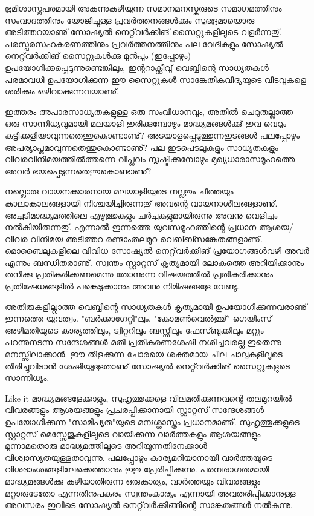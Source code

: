ഭൂമിശാസ്ത്രപരമായി അകന്നുകഴിയുന്ന സമാനമനസ്കരുടെ സമാഗമത്തിനും സംവാദത്തിനും യോജിച്ചുള്ള പ്രവര്‍ത്തനങ്ങള്‍ക്കും 
സുഭദ്രമായൊരു അടിത്തറയാണു് സോഷ്യല്‍ നെറ്റ്‌വര്‍ക്കിങ് സൈറ്റുകളിലൂടെ വളര്‍ന്നതു്. പരസ്പരസഹകരണത്തിനും 
പ്രവര്‍ത്തനത്തിനും പല വേദികളും സോഷ്യല്‍ നെറ്റ്‌വര്‍ക്കിങ് സൈറ്റുകള്‍ക്കു മുന്‍പും (ഇപ്പോഴും) ഉപയോഗിക്കപ്പെടുന്നുണ്ടെങ്കിലും, 
ഇന്ററാക്റ്റീവു് വെബ്ബിന്റെ സാധ്യതകള്‍ പരമാവധി ഉപയോഗിക്കുന്ന ഈ സൈറ്റുകള്‍ സാങ്കേതികവിദ്യയുടെ വിടവുകളെ ശരിക്കും 
ഒഴിവാക്കുന്നവയാണു്.

ഇത്തരം അപാരസാധ്യതകളുള്ള ഒരു സംവിധാനവും, അതില്‍ ചെറുതല്ലാത്ത ഒരു സാന്നിധ്യവുമായി മലയാളി ഇരിക്കുമ്പോഴും 
മാദ്ധ്യമങ്ങള്‍ക്കു് ഇവ വെറും കുട്ടിക്കളിയാവുന്നതെന്തുകൊണ്ടാണു്? അടയാളപ്പെടുത്തുന്നഇടങ്ങള്‍ പലപ്പോഴും 
അപര്യാപ്തമാവുന്നതെന്തുകൊണ്ടാണു്? പല ഇടപെടലുകളും സാധ്യതകളും വിവരവിനിമയത്തില്‍ത്തന്നെ വിപ്ലവം സൃഷ്ടിക്കുമ്പോഴും 
മുഖ്യധാരാസമൂഹത്തെ അവര്‍ ഭയപ്പെടുന്നതെന്തുകൊണ്ടാണു്?

നല്ലൊരു വായനക്കാരനായ മലയാളിയുടെ നല്ലതും ചീത്തയും കാലാകാലങ്ങളായി നിശ്ചയിച്ചിരുന്നതു് അവന്റെ വായനാശീലങ്ങളാണു്.
 അച്ചടിമാദ്ധ്യമത്തിലെ എഴുത്തുകളും ചര്‍ച്ചകളുമായിരുന്നു അവനു വെളിച്ചം നല്‍കിയിരുന്നതു്. എന്നാല്‍ ഇന്നത്തെ 
യുവസമൂഹത്തിന്റെ പ്രധാന ആശയ/വിവര വിനിമയ അടിത്തറ രണ്ടാംതലമുറ വെബ്ബ്സങ്കേതങ്ങളാണു്. മൊബൈലുകളിലെ 
വിവിധ സോഷ്യല്‍ നെറ്റ്‌വര്‍ക്കിങ് പ്രയോഗങ്ങള്‍വഴി അവര്‍ എന്നും ബന്ധിതരാണു്. സ്വന്തം സ്റ്റാറ്റസ് കൃത്യമായി ലോകത്തെ 
അറിയിക്കാനും തനിക്കു പ്രതികരിക്കണമെന്നു തോന്നുന്ന വിഷയത്തില്‍ പ്രതികരിക്കാനും പ്രതിഷേധങ്ങളില്‍ പങ്കെടുക്കാനും അവനു 
നിമിഷങ്ങളേ വേണ്ടു.

അതിരുകളില്ലാത്ത വെബ്ബിന്റെ സാധ്യതകള്‍ കൃത്യമായി ഉപയോഗിക്കുന്നവരാണു് ഇന്നത്തെ യുവത്വം. "ബര്‍ക്കാഗേറ്റി"ലും, 
"കോമണ്‍വെല്‍ത്തു്" ഗെയിംസ് അഴിമതിയുടെ കാര്യത്തിലും, ട്വിറ്ററിലും ബസ്സിലും ഫേസ്ബുക്കിലും മറ്റും പറന്നുനടന്ന സന്ദേശങ്ങള്‍ 
മതി പ്രതികരണശേഷി നശിച്ചവരല്ല ഇതെന്നു മനസ്സിലാക്കാന്‍. ഈ തിളക്കുന്ന ചോരയെ ശക്തമായ ചില ചാലുകളിലൂടെ തിരിച്ചുവിടാന്‍ 
ശേഷിയുള്ളതാണു് സോഷ്യല്‍ നെറ്റ്‌വര്‍ക്കിങ് സൈറ്റുകളുടെ സാന്നിധ്യം.

Like it മാദ്ധ്യമങ്ങളേക്കാളും, സുഹൃത്തുക്കളെ വിലമതിക്കുന്നവന്റെ തലമുറയില്‍ വിവരങ്ങളും ആശയങ്ങളും പ്രചരപ്പിക്കാനായി 
സ്റ്റാറ്റസ് സന്ദേശങ്ങള്‍ ഉപയോഗിക്കുന്ന "സാമീപ്യത"യുടെ മനഃശ്ശാസ്ത്രം പ്രധാനമാണു്. സുഹൃത്തുക്കളുടെ സ്റ്റാറ്റസ് മെസ്സേജുകളിലൂടെ 
വായിക്കുന്ന വാര്‍ത്തകളും ആശയങ്ങളും മൂന്നാമതൊരു മാദ്ധ്യമത്തിലൂടെ അറിയുന്നതിനേക്കാള്‍ വിശ്വാസ്യതയുള്ളതാവുന്നു. 
പലപ്പോഴും കാര്യമറിയാനായി വാര്‍ത്തയുടെ വിശദാംശങ്ങളിലേക്കെത്താനും ഇതു പ്രേരിപ്പിക്കുന്നു. പരമ്പരാഗതമായി 
മാദ്ധ്യമങ്ങള്‍ക്കു കഴിയാതിരുന്ന ഒരുകാര്യം, വാര്‍ത്തയും വിവരങ്ങളും മറ്റാരുടേതോ എന്നതിനുപകരം സ്വന്തംകാര്യം എന്നായി
 അവതരിപ്പിക്കാനുള്ള അവസരം ഇവിടെ സോഷ്യല്‍ നെറ്റ്‌വര്‍ക്കിങ്ങിന്റെ സങ്കേതങ്ങള്‍ നല്‍കുന്നു.

